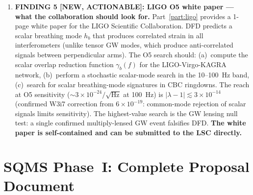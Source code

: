 \documentclass[11pt]{article}
\newcommand{\ee}[1]{\times 10^{#1}}
\newcommand{\lbone}{|\lambda - 1|}
\begin{document}
\begin{tcolorbox}[colback=blue!5!white, colframe=blue!60!black,
  title=\textbf{W4i16 TOP 5 FINDINGS --- Ranked by Programme Impact}]
\begin{enumerate}
\item \textbf{FINDING 5 [NEW, ACTIONABLE]: LIGO O5 white paper ---
what the collaboration should look for.}
Part~\ref{part:ligo} provides a 1-page white paper for the LIGO
Scientific Collaboration. DFD predicts a scalar breathing mode $h_b$
that produces correlated strain in all interferometers (unlike tensor
GW modes, which produce anti-correlated signals between perpendicular
arms). The O5 search should: (a)~compute the scalar overlap reduction
function $\gamma_b(f)$ for the LIGO-Virgo-KAGRA network, (b)~perform
a stochastic scalar-mode search in the 10--100~Hz band, (c)~search for
scalar breathing-mode signatures in CBC ringdowns. The reach at O5
sensitivity ($\sim 3\ee{-24}/\sqrt{\text{Hz}}$ at 100~Hz) is $\lbone
\lesssim 3\ee{-14}$ (confirmed W3i7 correction from $6\ee{-19}$:
common-mode rejection of scalar signals limits sensitivity). The
highest-value search is the GW lensing null test: a single confirmed
multiply-lensed GW event falsifies DFD.
\textbf{The white paper is self-contained and can be submitted to
the LSC directly.}

\end{enumerate}
\end{tcolorbox}

\tableofcontents
\newpage


\part{SQMS Phase~I: Complete Proposal Document}
\label{part:sqms}
\end{document}
